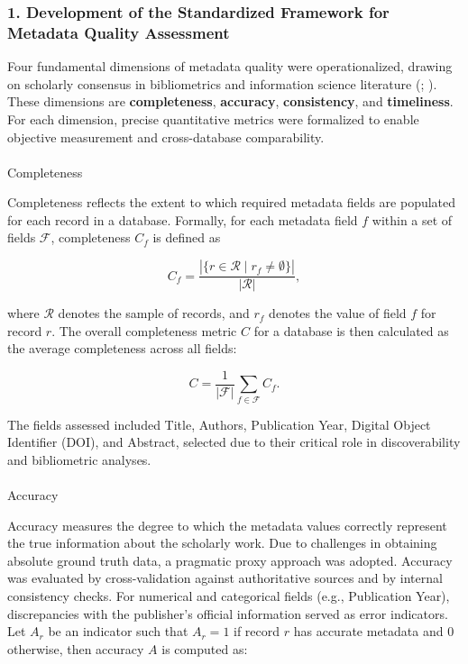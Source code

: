 \documentclass[
  12pt,
]{article}
\makeatletter
\let\oldparagraph\paragraph
\renewcommand{\paragraph}{
    \@ifstar
      \xxxParagraphStar
      \xxxParagraphNoStar
  }
\newcommand{\xxxParagraphStar}[1]{\oldparagraph*{#1}\mbox{}}
\newcommand{\xxxParagraphNoStar}[1]{\oldparagraph{#1}\mbox{}}
\makeatother
\begin{document}
\subsubsection{1. Development of the Standardized Framework for Metadata
Quality
Assessment}\label{development-of-the-standardized-framework-for-metadata-quality-assessment}

Four fundamental dimensions of metadata quality were operationalized,
drawing on scholarly consensus in bibliometrics and information science
literature (;
). These dimensions are
\textbf{completeness}, \textbf{accuracy}, \textbf{consistency}, and
\textbf{timeliness}. For each dimension, precise quantitative metrics
were formalized to enable objective measurement and cross-database
comparability.

\paragraph{Completeness}\label{completeness}

Completeness reflects the extent to which required metadata fields are
populated for each record in a database. Formally, for each metadata
field \(f\) within a set of fields \(\mathcal{F}\), completeness \(C_f\)
is defined as

\[
C_f = \frac{\left| \{ r \in \mathcal{R} \mid r_f \neq \emptyset \} \right|}{|\mathcal{R}|},
\]

where \(\mathcal{R}\) denotes the sample of records, and \(r_f\) denotes
the value of field \(f\) for record \(r\). The overall completeness
metric \(C\) for a database is then calculated as the average
completeness across all fields:

\[
C = \frac{1}{|\mathcal{F}|} \sum_{f \in \mathcal{F}} C_f.
\]

The fields assessed included Title, Authors, Publication Year, Digital
Object Identifier (DOI), and Abstract, selected due to their critical
role in discoverability and bibliometric analyses.

\paragraph{Accuracy}\label{accuracy}

Accuracy measures the degree to which the metadata values correctly
represent the true information about the scholarly work. Due to
challenges in obtaining absolute ground truth data, a pragmatic proxy
approach was adopted. Accuracy was evaluated by cross-validation against
authoritative sources and by internal consistency checks. For numerical
and categorical fields (e.g., Publication Year), discrepancies with the
publisher's official information served as error indicators. Let \(A_r\)
be an indicator such that \(A_r = 1\) if record \(r\) has accurate
metadata and 0 otherwise, then accuracy \(A\) is computed as:
\end{document}

